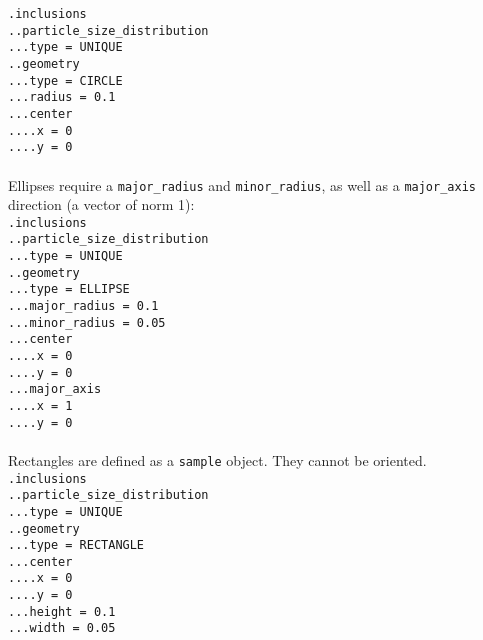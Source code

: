 \documentclass[10pt]{article}
\begin{document}
\noindent \verb+.inclusions+\\
\verb+..particle_size_distribution+\\
\verb+...type = UNIQUE+\\
\verb+..geometry+\\
\verb+...type = CIRCLE+\\
\verb+...radius = 0.1+\\
\verb+...center+\\
\verb+....x = 0+\\
\verb+....y = 0+

\paragraph{}Ellipses require a \verb+major_radius+ and \verb+minor_radius+, as well as a \verb+major_axis+ direction (a vector of norm 1):\\

\noindent \verb+.inclusions+\\
\verb+..particle_size_distribution+\\
\verb+...type = UNIQUE+\\
\verb+..geometry+\\
\verb+...type = ELLIPSE+\\
\verb+...major_radius = 0.1+\\
\verb+...minor_radius = 0.05+\\
\verb+...center+\\
\verb+....x = 0+\\
\verb+....y = 0+\\
\verb+...major_axis+\\
\verb+....x = 1+\\
\verb+....y = 0+

\paragraph{}Rectangles are defined as a \verb+sample+ object. They cannot be oriented.\\

\noindent \verb+.inclusions+\\
\verb+..particle_size_distribution+\\
\verb+...type = UNIQUE+\\
\verb+..geometry+\\
\verb+...type = RECTANGLE+\\
\verb+...center+\\
\verb+....x = 0+\\
\verb+....y = 0+\\
\verb+...height = 0.1+\\
\verb+...width = 0.05+
\end{document}
